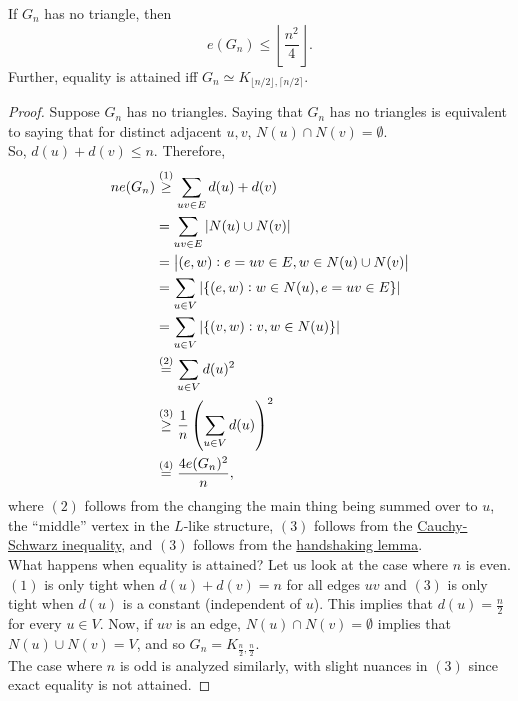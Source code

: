 \documentclass{article}
\begin{document}
		\begin{ftheo}
		\label{Mantel's Theorem}
			If $G_n$ has no triangle, then
			\[ e(G_n) \le \left\lfloor \frac{n^2}{4} \right\rfloor. \]
			Further, equality is attained iff $G_n \simeq K_{\lfloor n/2\rfloor , \lceil n/2 \rceil}$.
		\end{ftheo}
		\begin{proof}
			Suppose $G_n$ has no triangles. Saying that $G_n$ has no triangles is equivalent to saying that for distinct adjacent $u,v$, $N(u) \cap N(v) = \emptyset$.\\
			So, $d(u) + d(v) \le n$. Therefore,
			\begin{align*}
				ne(G_n) &\stackrel{\small{(1)}}{\ge} \sum_{uv \in E} d(u) + d(v) \\
					&= \sum_{uv \in E} |N(u) \cup N(v)| \\
					&= \left| (e, w) : e = uv \in E, w \in N(u) \cup N(v) \right| \\
					&= \sum_{u\in V} |\{ (e , w) : w \in N(u) , e = uv \in E \}| \\
					&= \sum_{u \in V} |\{ (v,w) : v,w \in N(u) \}| \\
					&\stackrel{\small{(2)}}{=} \sum_{u \in V} d(u)^2 \\
					&\stackrel{\small{(3)}}{\ge} \frac{1}{n} \left( \sum_{u \in V} d(u) \right)^2 \\
					&\stackrel{\small{(4)}}{=} \frac{4 e(G_n)^2}{n},
			\end{align*}
			where $(2)$ follows from the changing the main thing being summed over to $u$, the ``middle'' vertex in the $L$-like structure, $(3)$ follows from the \href{https://en.wikipedia.org/wiki/Cauchy-Schwarz_inequality}{Cauchy-Schwarz inequality}, and $(3)$ follows from the \href{https://en.wikipedia.org/wiki/Handshaking_lemma}{handshaking lemma}.\\

			What happens when equality is attained? Let us look at the case where $n$ is even.\\
			$(1)$ is only tight when $d(u) + d(v) = n$ for all edges $uv$ and $(3)$ is only tight when $d(u)$ is a constant (independent of $u$). This implies that $d(u) = \frac{n}{2}$ for every $u\in V$. Now, if $uv$ is an edge, $N(u) \cap N(v) = \emptyset$ implies that $N(u) \cup N(v) = V$, and so $G_n = K_{\frac{n}{2}, \frac{n}{2}}$.\\
			The case where $n$ is odd is analyzed similarly, with slight nuances in $(3)$ since exact equality is not attained.
		\end{proof}
		
\end{document}
